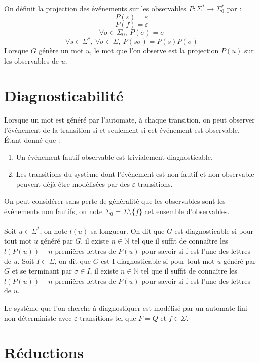 \documentclass[10pt,a4paper]{article}
\begin{document}
On définit la projection des événements sur les observables $P:\Sigma^* \rightarrow \Sigma_0^*$ par :
$$P(\varepsilon) = \varepsilon$$
$$P(f) = \varepsilon$$
$$\forall \sigma \in \Sigma_0,\ P(\sigma) = \sigma$$
$$\forall s \in \Sigma^*, \ \forall \sigma \in \Sigma,\ P(s\sigma) = P(s)P(\sigma)$$
Lorsque $G$ génère un mot $u$, le mot que l'on observe est la projection $P(u)$ sur les observables de $u$.

\section{Diagnosticabilit\'e}

Lorsque un mot est généré par l'automate, à chaque transition, on peut observer l’événement de la transition si et seulement si cet événement est observable. Étant donné que :
\begin{enumerate}
\item Un événement fautif observable est trivialement diagnosticable.
\item Les transitions du système dont l'événement est non fautif et non observable peuvent déjà être modélisées par des $\varepsilon$-transitions.
\end{enumerate} 
On peut considérer sans perte de généralité que les observables sont les événements non fautifs, on note $\Sigma_0 = \Sigma \setminus \{f\}$ cet ensemble d'observables.
\paragraph{}
Soit $u \in \Sigma^*$, on note $l(u)$ sa longueur. On dit que $G$ est diagnosticable si pour tout mot $u$ généré par $G$, il existe $n \in \mathbb{N}$ tel que il suffit de connaître les $l(P(u)) + n$ premières lettres de $P(u)$ pour savoir si f est l'une des lettres de $u$. Soit $I \subset \Sigma$, on dit que $G$ est I-diagnosticable si pour tout mot $u$ généré par $G$ et se terminant par $\sigma \in I$, il existe $n \in \mathbb{N}$ tel que il suffit de connaître les $l(P(u)) + n$ premières lettres de $P(u)$ pour savoir si f est l'une des lettres de $u$.

Le système que l'on cherche à diagnostiquer est modélisé par un automate fini non d\'eterministe avec $\varepsilon$-transitions tel que $F=Q$ et $f\in \Sigma$.


\section{R\'eductions}
\end{document}
